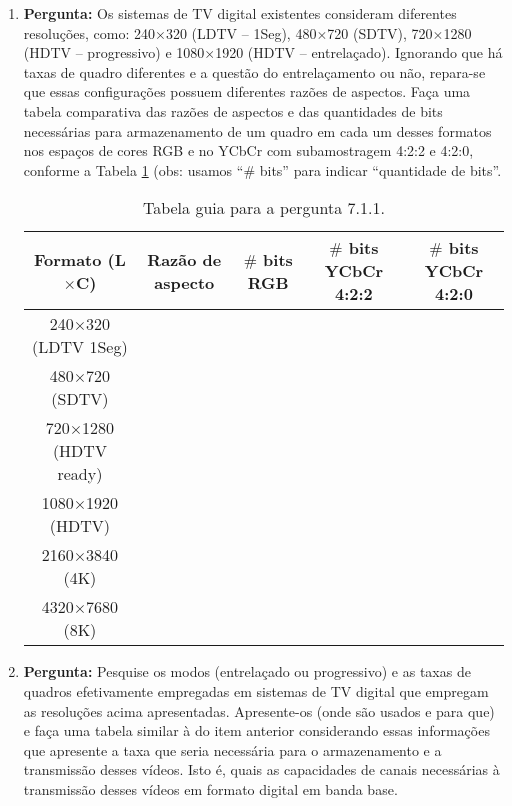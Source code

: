 \documentclass[11pt]{article}
\begin{document}
\begin{enumerate}

\item \textbf{Pergunta:} Os sistemas de TV digital existentes consideram diferentes resoluções, como: 240$\times$320 (LDTV -- 1Seg), 480$\times$720 (SDTV), 720$\times$1280 (HDTV -- progressivo) e 1080$\times$1920 (HDTV -- entrelaçado). Ignorando que há taxas de quadro diferentes e a questão do entrelaçamento ou não, repara-se que essas configurações possuem diferentes razões de aspectos. Faça uma tabela comparativa das razões de aspectos e das quantidades de bits necessárias para armazenamento de um quadro em cada um desses formatos nos espaços de cores RGB e no YCbCr com subamostragem 4:2:2 e 4:2:0, conforme a Tabela \ref{tab:guia-resols} (obs: usamos ``$\#$ bits'' para indicar ``quantidade de bits''.

\begin{table}[h!]
\centering
\begin{footnotesize}
\caption{Tabela guia para a pergunta 7.1.1.} \label{tab:guia-resols}
\begin{tabular}{|c||c||c|c|c|} \hline
Formato (L$\times$C) & Razão de aspecto & $\#$ bits RGB & $\#$ bits YCbCr 4:2:2 & $\#$ bits YCbCr 4:2:0 \\ \hline \hline
240$\times$320 (LDTV 1Seg) & & & & \\ \hline 
480$\times$720 (SDTV) & & & & \\ \hline
720$\times$1280 (HDTV ready) & & & & \\ \hline
1080$\times$1920 (HDTV) & & & & \\ \hline
2160$\times$3840 (4K) & & & & \\ \hline
4320$\times$7680 (8K) & & & & \\ \hline
\end{tabular}
\end{footnotesize}
\end{table}

\item \textbf{Pergunta:} Pesquise os modos (entrelaçado ou progressivo) e as taxas de quadros efetivamente empregadas em sistemas de TV digital que empregam as resoluções acima apresentadas. Apresente-os (onde são usados e para que) e faça uma tabela similar à do item anterior considerando essas informações que apresente a taxa que seria necessária para o armazenamento e a transmissão desses vídeos. Isto é, quais as capacidades de canais necessárias à transmissão desses vídeos em formato digital em banda base.


\end{enumerate}
\end{document}
